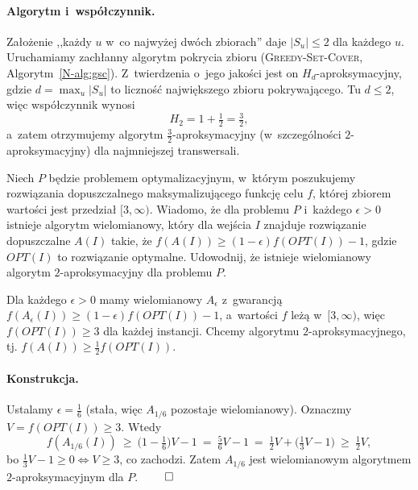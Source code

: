 \paragraph{Algorytm i~współczynnik.}
Założenie ,,każdy $u$ w~co najwyżej dwóch zbiorach'' daje $|S_u|\leq 2$ dla
każdego $u$. Uruchamiamy zachłanny algorytm pokrycia zbioru
(\textsc{Greedy-Set-Cover}, Algorytm~\ref{N-alg:gsc}). Z~twierdzenia o~jego
jakości jest on $H_d$-aproksymacyjny, gdzie $d=\max_{u}|S_u|$ to liczność
największego zbioru pokrywającego. Tu $d\leq 2$, więc współczynnik wynosi
\[
	H_2=1+\tfrac12=\tfrac32,
\]
a~zatem otrzymujemy algorytm $\tfrac32$-aproksymacyjny (w~szczególności
$2$-aproksymacyjny) dla najmniejszej transwersali.

\clearpage
\begin{zadanie}
	Niech $P$ będzie problemem optymalizacyjnym, w~którym poszukujemy rozwiązania
	dopuszczalnego maksymalizującego funkcję celu $f$, której zbiorem wartości
	jest przedział $[3,\infty)$. Wiadomo, że dla problemu $P$ i~każdego
	$\epsilon>0$ istnieje algorytm wielomianowy, który dla wejścia $I$ znajduje
	rozwiązanie dopuszczalne $A(I)$ takie, że $f(A(I))\geq(1-\epsilon)f(OPT(I))-1$,
	gdzie $OPT(I)$ to rozwiązanie optymalne. Udowodnij, że istnieje wielomianowy
	algorytm $2$-aproksymacyjny dla problemu $P$.
\end{zadanie}

Dla każdego $\epsilon>0$ mamy wielomianowy $A_\epsilon$ z~gwarancją
$f(A_\epsilon(I))\geq(1-\epsilon)f(OPT(I))-1$, a~wartości $f$ leżą w~$[3,\infty)$,
więc $f(OPT(I))\geq 3$ dla każdej instancji. Chcemy algorytmu $2$-aproksymacyjnego,
tj. $f(A(I))\geq\tfrac12 f(OPT(I))$.

\paragraph{Konstrukcja.}
Ustalamy $\epsilon=\tfrac16$ (stała, więc $A_{1/6}$ pozostaje wielomianowy).
Oznaczmy $V=f(OPT(I))\geq 3$. Wtedy
\[
	f(A_{1/6}(I))\ \geq\ \big(1-\tfrac16\big)V-1
	\ =\ \tfrac56 V-1
	\ =\ \tfrac12 V+\Big(\tfrac13 V-1\Big)
	\ \geq\ \tfrac12 V,
\]
bo $\tfrac13 V-1\geq 0\iff V\geq 3$, co zachodzi. Zatem $A_{1/6}$ jest
wielomianowym algorytmem $2$-aproksymacyjnym dla $P$. $\qed$
